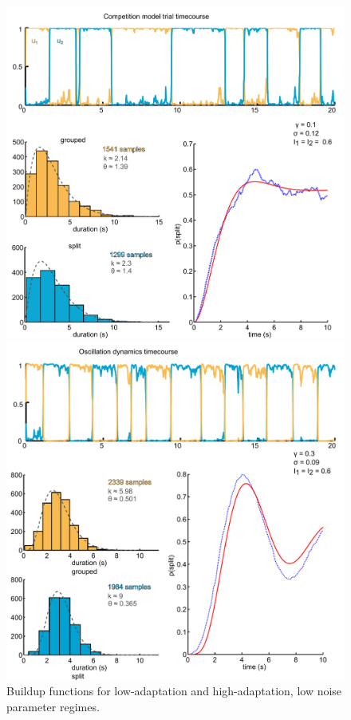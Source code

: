 \documentclass[10pt]{article}
\begin{document}
\begin{figure}[scale = 0.8]
   \begin{center}
   
   \includegraphics[scale=0.33]{BUFs_hists_lowadapt}
   
   \includegraphics[scale=.33]{hi_adapt_low_noise_equal_inputBUFshists}      
   \caption{Buildup functions for low-adaptation and high-adaptation, low noise parameter regimes.}
   	\label{fig:mono_vs_periodic}
   \end{center}
\end{figure}
\end{document}

